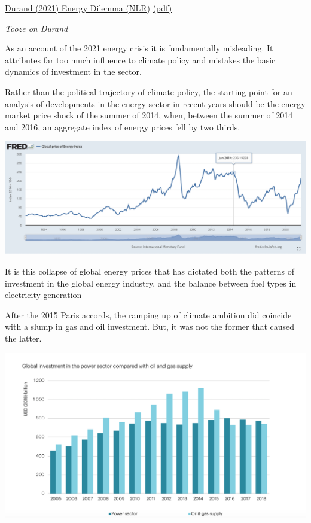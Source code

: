 \documentclass[
]{book}
\begin{document}
\href{https://newleftreview.org/sidecar/posts/energy-dilemma}{Durand (2021) Energy Dilemma (NLR)}
\href{pdf/Durand_2021_Energy_Dilemma_NLR.pdf}{(pdf)}

\emph{Tooze on Durand}

As an account of the 2021 energy crisis it is fundamentally misleading. It attributes far too much influence to climate policy and mistakes the basic dynamics of investment in the sector.

Rather than the political trajectory of climate policy, the starting point for an analysis of developments in the energy sector in recent years should be the energy market price shock of the summer of 2014, when, between the summer of 2014 and 2016, an aggregate index of energy prices fell by two thirds.

\includegraphics{fig/energy_2014_price_shock.png}

It is this collapse of global energy prices that has dictated both the patterns of investment in the global energy industry, and the balance between fuel types in electricity generation

After the 2015 Paris accords, the ramping up of climate ambition did coincide with a slump in gas and oil investment. But, it was not the former that caused the latter.

\includegraphics{fig/power_investment_oil_and_gas_supply.png}
\end{document}
